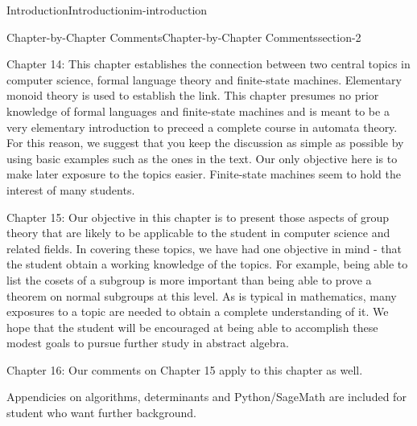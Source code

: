 \documentclass[oneside,10pt,]{book}
\begin{document}
\begin{chapterptx}{Introduction}{}{Introduction}{}{}{im-introduction}
\begin{sectionptx}{Chapter-by-Chapter Comments}{}{Chapter-by-Chapter Comments}{}{}{section-2}
\par
\hypertarget{p-22}{}%
Chapter 14: This chapter establishes the connection between two central topics in computer science, formal language theory and finite-state machines. Elementary monoid theory is used to establish the link. This chapter presumes no prior knowledge of formal languages and finite-state machines and is meant to be a very elementary introduction to preceed a complete course in automata theory. For this reason, we suggest that you keep the discussion as simple as possible by using basic examples such as the ones in the text.  Our only objective here is to make later exposure to the topics easier. Finite-state machines seem to hold the interest of many students.%
\par
\hypertarget{p-23}{}%
Chapter 15: Our objective in this chapter is to present those aspects of group theory that are likely to be applicable to the student in computer science and related fields. In covering these topics, we have had one objective in mind - that the student obtain a working knowledge of the topics. For example, being able to list the cosets of a subgroup is more important than being able to prove a theorem on normal subgroups at this level. As is typical in mathematics, many exposures to a topic are needed to obtain a complete understanding of it. We hope that the student will be encouraged at being able to accomplish these modest goals to pursue further study in abstract algebra.%
\par
\hypertarget{p-24}{}%
Chapter 16: Our comments on Chapter 15 apply to this chapter as well.%
\par
\hypertarget{p-25}{}%
Appendicies on algorithms, determinants and Python\slash{}SageMath are included for student who want further background.%
\end{sectionptx}
\end{chapterptx}
%
%
\typeout{************************************************}
\typeout{************************************************}
%
\end{document}
